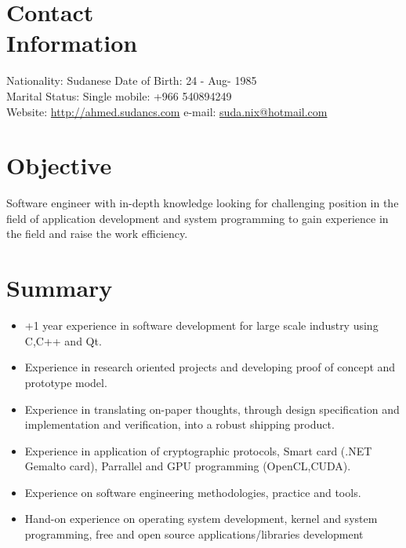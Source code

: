 \documentclass[margin,line]{resume}
\begin{document}
\begin{resume}

    \section{\mysidestyle Contact\\Information}

    Nationality: Sudanese                            \hfill Date of Birth: 24 - Aug- 1985 \vspace{0mm}\\\vspace{0mm}%
   Marital Status: Single                              \hfill mobile: +966 540894249          \vspace{0mm}\\\vspace{0mm}%
    Website: \url{http://ahmed.sudancs.com}      \hfill e-mail: \href{mailto:suda.nix@hotmail.com}{suda.nix@hotmail.com}  \vspace{0mm}\\\vspace{-4.5mm}%

\section{\mysidestyle Objective}
Software engineer with in-depth knowledge looking for challenging position in the field of application development and system programming to gain experience in the field and raise the work efficiency.

    \section{\mysidestyle Summary}
\begin{itemize}
\item +1 year experience in  software development for large scale industry using C,C++ and Qt.
\item Experience in research oriented projects and developing proof of concept and prototype model.
\item Experience in translating on-paper thoughts, through design specification and implementation and verification, into a robust shipping product.
\item Experience in application of cryptographic protocols, Smart card (.NET Gemalto card), Parrallel and GPU programming (OpenCL,CUDA).
\item Experience on software engineering methodologies, practice and tools.
\item Hand-on experience on operating system development, kernel and system programming, free and open source applications/libraries development
\end{itemize}


\end{resume}
\end{document}
